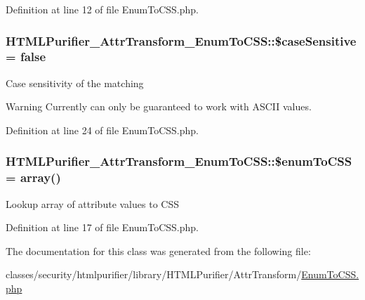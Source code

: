 Definition at line 12 of file Enum\+To\+C\+S\+S.\+php.

\hypertarget{classHTMLPurifier__AttrTransform__EnumToCSS_a009481d77e57d9880f2be25b9e2e6303}{
\subsubsection[{\$case\+Sensitive}]{\setlength{\rightskip}{0pt plus 5cm}H\+T\+M\+L\+Purifier\+\_\+\+Attr\+Transform\+\_\+\+Enum\+To\+C\+S\+S\+::\$case\+Sensitive = false\hspace{0.3cm}{\ttfamily [protected]}}}\label{classHTMLPurifier__AttrTransform__EnumToCSS_a009481d77e57d9880f2be25b9e2e6303}
Case sensitivity of the matching \begin{DoxyWarning}{Warning}
Currently can only be guaranteed to work with A\+S\+C\+I\+I values. 
\end{DoxyWarning}


Definition at line 24 of file Enum\+To\+C\+S\+S.\+php.

\hypertarget{classHTMLPurifier__AttrTransform__EnumToCSS_a8ccbc09476300832cb12fa0c2ce1181d}{
\subsubsection[{\$enum\+To\+C\+S\+S}]{\setlength{\rightskip}{0pt plus 5cm}H\+T\+M\+L\+Purifier\+\_\+\+Attr\+Transform\+\_\+\+Enum\+To\+C\+S\+S\+::\$enum\+To\+C\+S\+S = array()\hspace{0.3cm}{\ttfamily [protected]}}}\label{classHTMLPurifier__AttrTransform__EnumToCSS_a8ccbc09476300832cb12fa0c2ce1181d}
Lookup array of attribute values to C\+S\+S 

Definition at line 17 of file Enum\+To\+C\+S\+S.\+php.



The documentation for this class was generated from the following file\+:\begin{DoxyCompactItemize}
\item 
classes/security/htmlpurifier/library/\+H\+T\+M\+L\+Purifier/\+Attr\+Transform/\hyperlink{EnumToCSS_8php}{Enum\+To\+C\+S\+S.\+php}\end{DoxyCompactItemize}
